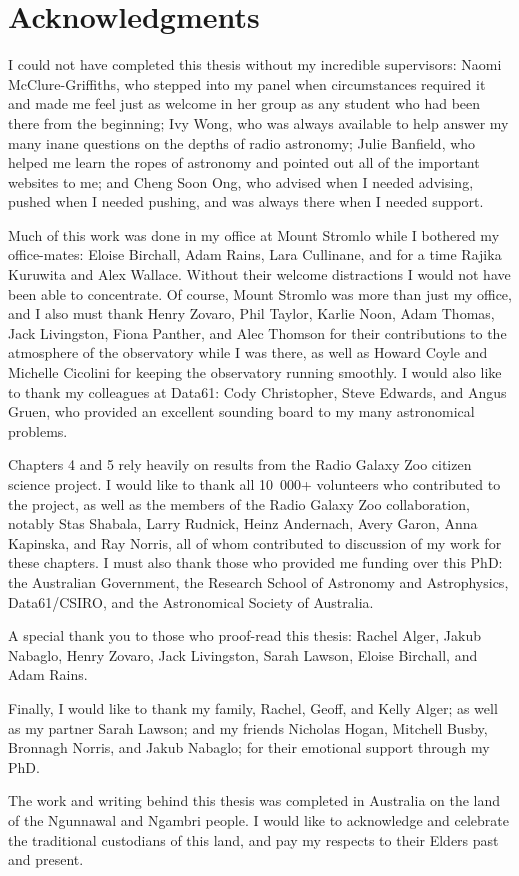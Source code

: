 \chapter*{Acknowledgments}

I could not have completed this thesis without my incredible supervisors: Naomi McClure-Griffiths, who stepped into my panel when circumstances required it and made me feel just as welcome in her group as any student who had been there from the beginning; Ivy Wong, who was always available to help answer my many inane questions on the depths of radio astronomy; Julie Banfield, who helped me learn the ropes of astronomy and pointed out all of the important websites to me; and Cheng Soon Ong, who advised when I needed advising, pushed when I needed pushing, and was always there when I needed support.

Much of this work was done in my office at Mount Stromlo while I bothered my office-mates: Eloise Birchall, Adam Rains, Lara Cullinane, and for a time Rajika Kuruwita and Alex Wallace. Without their welcome distractions I would not have been able to concentrate. Of course, Mount Stromlo was more than just my office, and I also must thank Henry Zovaro, Phil Taylor, Karlie Noon, Adam Thomas, Jack Livingston, Fiona Panther, and Alec Thomson for their contributions to the atmosphere of the observatory while I was there, as well as Howard Coyle and Michelle Cicolini for keeping the observatory running smoothly. I would also like to thank my colleagues at Data61: Cody Christopher, Steve Edwards, and Angus Gruen, who provided an excellent sounding board to my many astronomical problems.

Chapters 4 and 5 rely heavily on results from the Radio Galaxy Zoo citizen science project. I would like to thank all 10~000+ volunteers who contributed to the project, as well as the members of the Radio Galaxy Zoo collaboration, notably Stas Shabala, Larry Rudnick, Heinz Andernach, Avery Garon, Anna Kapinska, and Ray Norris, all of whom contributed to discussion of my work for these chapters. I must also thank those who provided me funding over this PhD: the Australian Government, the Research School of Astronomy and Astrophysics, Data61/CSIRO, and the Astronomical Society of Australia.

A special thank you to those who proof-read this thesis: Rachel Alger, Jakub Nabaglo, Henry Zovaro, Jack Livingston, Sarah Lawson, Eloise Birchall, and Adam Rains.

Finally, I would like to thank my family, Rachel, Geoff, and Kelly Alger; as well as my partner Sarah Lawson; and my friends Nicholas Hogan, Mitchell Busby, Bronnagh Norris, and Jakub Nabaglo; for their emotional support through my PhD.

\clearpage

The work and writing behind this thesis was completed in Australia on the land of the Ngunnawal and Ngambri people. I would like to acknowledge and celebrate the traditional custodians of this land, and pay my respects to their Elders past and present.
